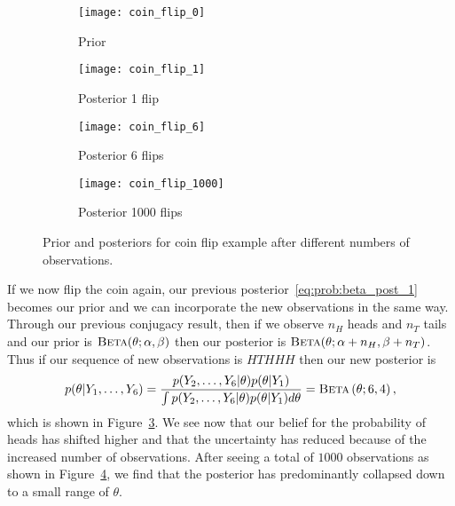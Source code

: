 \begin{figure}[t]
	\centering
	\begin{subfigure}[t]{0.24\textwidth}
		\texttt{[image: coin\_flip\_0]}
		\caption{Prior \label{fig:inf:coin_flip:0}}
	\end{subfigure}
	\begin{subfigure}[t]{0.24\textwidth}
		\texttt{[image: coin\_flip\_1]}
		\caption{Posterior 1 flip \label{fig:inf:coin_flip:1}}
	\end{subfigure}
	\begin{subfigure}[t]{0.24\textwidth}
		\texttt{[image: coin\_flip\_6]}
		\caption{Posterior 6 flips \label{fig:inf:coin_flip:6}}
	\end{subfigure}
	\begin{subfigure}[t]{0.24\textwidth}
		\texttt{[image: coin\_flip\_1000]}
		\caption{Posterior 1000 flips \label{fig:inf:coin_flip:1000}}
	\end{subfigure}
	\caption{Prior and posteriors for coin flip example after different numbers
		of observations.
		\label{fig:inf:coin_flip}}
\end{figure}

If we now flip the coin again, our previous posterior~\eqref{eq:prob:beta_post_1} becomes our
prior and we can incorporate the new observations in the same way.  
Through our previous conjugacy result, then if we observe $n_{H}$ heads
and $n_{T}$ tails and our prior is $\textsc{Beta}(\theta ; \alpha, \beta)$ then our posterior is
$\textsc{Beta}(\theta ; \alpha+n_H, \beta+n_T)$.
Thus if our sequence of new
observations is $HTHHH$ then our new posterior is
\begin{align}
p(\theta | Y_1,\dots,Y_6) = \frac{p(Y_2,\dots,Y_6 | \theta)p(\theta | Y_1)}
{\int p(Y_2,\dots,Y_6 | \theta)p(\theta | Y_1) d\theta} = \textsc{Beta}\left(\theta ; 6,4\right),
\end{align}
which is shown in Figure~\ref{fig:inf:coin_flip:6}.  We see now that our belief for the probability of heads
has shifted higher and that the uncertainty has reduced because of the increased number
of observations.
After seeing a total of $1000$ observations as shown in Figure~\ref{fig:inf:coin_flip:1000}, we
find that the posterior has predominantly collapsed down to a small range of $\theta$.

